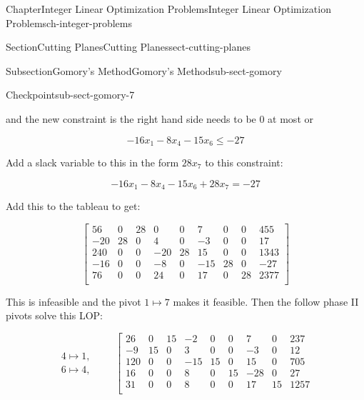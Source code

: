 \documentclass[oneside,10pt,]{book}
\numberwithin{equation}{section}
\newcommand{\amp}{&}
\begin{document}
\begin{chapterptx}{Chapter}{Integer Linear Optimization Problems}{}{Integer Linear Optimization Problems}{}{}{ch-integer-problems}
\begin{sectionptx}{Section}{Cutting Planes}{}{Cutting Planes}{}{}{sect-cutting-planes}
\begin{subsectionptx}{Subsection}{Gomory's Method}{}{Gomory's Method}{}{}{sub-sect-gomory}
\begin{inlineexercise}{Checkpoint}{}{sub-sect-gomory-7}
%
\par
and the new constraint is the right hand side needs to be 0 at most or%
\par
%
\begin{equation*}
-16x_1 -8x_4 - 15 x_6 \leq -27
\end{equation*}
%
\par
Add a slack variable to this in the form \(28x_7\) to this constraint:%
\par
%
\begin{equation*}
-16x_1-8x_4-15x_6 + 28 x_7 = -27
\end{equation*}
%
\par
Add this to the tableau to get:%
\par
%
\begin{equation*}
\left[\begin{array}{rrr|rrrrr|r}
56 \amp 0 \amp 28 \amp 0 \amp 0 \amp 7 \amp 0 \amp 0 \amp 455\\
-20 \amp 28 \amp 0 \amp 4 \amp 0 \amp -3 \amp 0 \amp 0 \amp 17\\
240 \amp 0 \amp 0 \amp -20 \amp 28 \amp 15 \amp 0 \amp 0 \amp 1343\\
-16 \amp 0 \amp 0 \amp -8 \amp 0 \amp -15 \amp 28 \amp 0 \amp -27\\ \hline
76 \amp 0 \amp 0 \amp 24 \amp 0 \amp 17 \amp 0 \amp 28 \amp 2377\\
\end{array} \right]
\end{equation*}
%
\par
This is infeasible and the pivot \(1 \mapsto 7\) makes it feasible.  Then the follow phase II pivots solve this LOP:%
\par
%
\begin{equation*}
\begin{array}{r} 4 \mapsto 1, \\ 6 \mapsto 4, \end{array}
\qquad
\left[\begin{array}{rrr|rrrrr|r}
26 \amp 0 \amp 15 \amp -2 \amp 0 \amp 0 \amp 7 \amp 0 \amp 237\\
-9 \amp 15 \amp 0 \amp 3 \amp 0 \amp 0 \amp -3 \amp 0 \amp 12\\
120 \amp 0 \amp 0 \amp -15 \amp 15 \amp 0 \amp 15 \amp 0 \amp 705\\
16 \amp 0 \amp 0 \amp 8 \amp 0 \amp 15 \amp -28 \amp 0 \amp 27\\ \hline
31 \amp 0 \amp 0 \amp 8 \amp 0 \amp 0 \amp 17 \amp 15 \amp 1257\\

\end{array}
\end{equation*}
\end{inlineexercise}
\end{subsectionptx}
\end{sectionptx}
\end{chapterptx}
\end{document}
